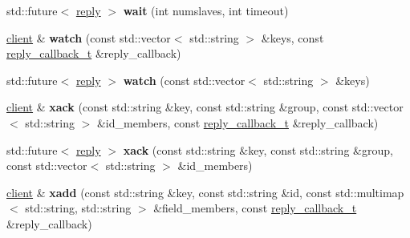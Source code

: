 \begin{DoxyCompactItemize}
\mbox{\label{classcpp__redis_1_1client_a4ef6f516a3dcdea1b317bb4e5e96e680}} 
std\+::future$<$ \mbox{\hyperlink{classcpp__redis_1_1reply}{reply}} $>$ {\bfseries wait} (int numslaves, int timeout)
\item 
\mbox{\label{classcpp__redis_1_1client_a7faae4f59e4b7f5b5003dcfbbf04af89}} 
\mbox{\hyperlink{classcpp__redis_1_1client}{client}} \& {\bfseries watch} (const std\+::vector$<$ std\+::string $>$ \&keys, const \mbox{\hyperlink{classcpp__redis_1_1client_af7a65eb21aa25230bfbb0b0203c4fc04}{reply\+\_\+callback\+\_\+t}} \&reply\+\_\+callback)
\item 
\mbox{\label{classcpp__redis_1_1client_a437606353878a903033ced5cb56ed07c}} 
std\+::future$<$ \mbox{\hyperlink{classcpp__redis_1_1reply}{reply}} $>$ {\bfseries watch} (const std\+::vector$<$ std\+::string $>$ \&keys)
\item 
\mbox{\label{classcpp__redis_1_1client_a0dcadd5ff04415ce91e3e6e74d6d2d48}} 
\mbox{\hyperlink{classcpp__redis_1_1client}{client}} \& {\bfseries xack} (const std\+::string \&key, const std\+::string \&group, const std\+::vector$<$ std\+::string $>$ \&id\+\_\+members, const \mbox{\hyperlink{classcpp__redis_1_1client_af7a65eb21aa25230bfbb0b0203c4fc04}{reply\+\_\+callback\+\_\+t}} \&reply\+\_\+callback)
\item 
\mbox{\label{classcpp__redis_1_1client_adf6d287bfe5f138966369c23ed7bb868}} 
std\+::future$<$ \mbox{\hyperlink{classcpp__redis_1_1reply}{reply}} $>$ {\bfseries xack} (const std\+::string \&key, const std\+::string \&group, const std\+::vector$<$ std\+::string $>$ \&id\+\_\+members)
\item 
\mbox{\label{classcpp__redis_1_1client_ac568014f9d7aa0e8af9babb2a01181a3}} 
\mbox{\hyperlink{classcpp__redis_1_1client}{client}} \& {\bfseries xadd} (const std\+::string \&key, const std\+::string \&id, const std\+::multimap$<$ std\+::string, std\+::string $>$ \&field\+\_\+members, const \mbox{\hyperlink{classcpp__redis_1_1client_af7a65eb21aa25230bfbb0b0203c4fc04}{reply\+\_\+callback\+\_\+t}} \&reply\+\_\+callback)
\item 
\mbox{\label{classcpp__redis_1_1client_a75954e600eae96d5dbd88361cd91a0da}} 

\end{DoxyCompactItemize}
